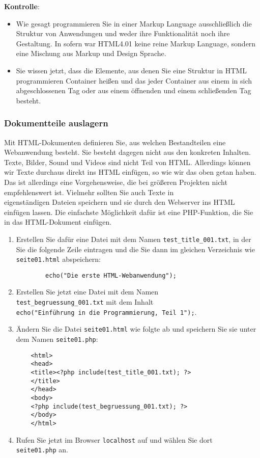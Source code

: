 \textbf{Kontrolle}:

\begin{itemize}
	\item Wie gesagt programmieren Sie in einer Markup Language ausschließlich die Struktur von Anwendungen und weder ihre Funktionalität noch ihre Gestaltung. In sofern war HTML4.01 keine reine Markup Language, sondern eine Mischung aus Markup und Design Sprache.
	\item Sie wissen jetzt, dass die Elemente, aus denen Sie eine Struktur in HTML programmieren Container heißen und das jeder Container aus einem in sich abgeschlossenen Tag oder aus einem öffnenden und einem schließenden Tag besteht.
\end{itemize}

\subsubsection{Dokumentteile auslagern}

Mit HTML-Dokumenten definieren Sie, aus welchen Bestandteilen eine Webanwendung besteht. Sie besteht dagegen nicht aus den konkreten Inhalten. Texte, Bilder, Sound und Videos sind nicht Teil von HTML. Allerdings können wir Texte durchaus direkt ins HTML einfügen, so wie wir das oben getan haben. Das ist allerdings eine Vorgehensweise, die bei größeren Projekten nicht empfehlenswert ist. Vielmehr sollten Sie auch Texte in\\eigenständigen Dateien speichern und sie durch den Webserver ins HTML einfügen lassen. Die einfachste Möglichkeit dafür ist eine PHP-Funktion, die Sie in das HTML-Dokument einfügen.\\

\begin{enumerate}
	\item Erstellen Sie dafür eine Datei mit dem Namen \verb|test_title_001.txt|, in der Sie die folgende Zeile eintragen und die Sie dann im gleichen Verzeichnis wie \verb|seite01.html| abspeichern:
	\begin{verbatim}
		echo("Die erste HTML-Webanwendung");
	\end{verbatim}
	\item Erstellen Sie jetzt eine Datei mit dem Namen\\ \verb|test_begruessung_001.txt| mit dem Inhalt\\ \verb|echo("Einführung in die Programmierung, Teil 1");|.
	\item Ändern Sie die Datei \verb|seite01.html| wie folgte ab und speichern Sie sie unter dem Namen \verb|seite01.php|:
	\begin{verbatim}
	<html>
	<head>
	<title><?php include(test_title_001.txt); ?>
	</title>
	</head>
	<body>
	<?php include(test_begruessung_001.txt); ?>
	</body>
	</html>
	\end{verbatim}
	\item Rufen Sie jetzt im Browser \verb|localhost| auf und wählen Sie dort\\ \verb|seite01.php| an.
\end{enumerate}


